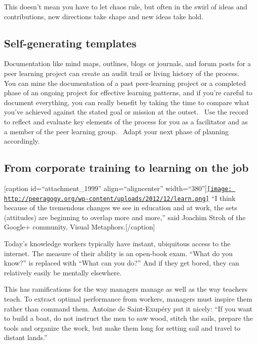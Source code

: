 This doesn't mean you have to let chaos rule, but often in the swirl of
ideas and contributions, new directions take shape and new ideas take
hold.

\subsection{Self-generating templates}

Documentation like mind maps, outlines, blogs or journals, and forum
posts for a peer learning project can create an audit trail or living
history of the process. You can mine the documentation of a past
peer-learning project or a completed phase of an ongoing project for
effective learning patterns, and if you're careful to document
everything, you can really benefit by taking the time to compare what
you've achieved against the stated goal or mission at the outset.~ Use
the record to reflect and evaluate key elements of the process for you
as a facilitator and as a member of the peer learning group.~ Adapt your
next phase of planning accordingly.

\subsection{From corporate training to learning on the job}

{[}caption id=``attachment\_1999'' align=``aligncenter''
width=``380''{]}\href{http://peeragogy.org/peer-learning-overview/learn-2/}{\texttt{[image: http://peeragogy.org/wp-content/uploads/2012/12/learn.png]}}
``I think because of the tremendous changes we see in education and at
work, the sets (attitudes) are beginning to overlap more and more,''
said Joachim Stroh of the Google+ community, Visual
Metaphors.{[}/caption{]}

Today's knowledge workers typically have instant, ubiquitous access to
the internet. The measure of their ability is an open-book exam. ``What
do you know?'' is replaced with ``What can you do?'' And if they get
bored, they can relatively easily be mentally elsewhere.

This has ramifications for the way managers manage as well as the way
teachers teach. To extract optimal performance from workers, managers
must inspire them rather than command them. Antoine de Saint-Exupéry put
it nicely: ``If you want to build a boat, do not instruct the men to saw
wood, stitch the sails, prepare the tools and organize the work, but
make them long for setting sail and travel to distant lands.''

